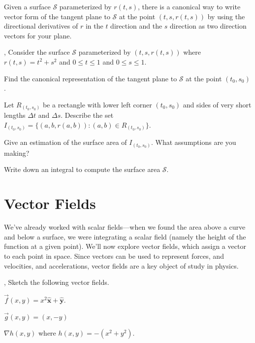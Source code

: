 \documentclass[letter]{article}
\newcommand{\xh}{{\hat {\mathbf x}}}
\newcommand{\yh}{{\hat {\mathbf y}}}
\newcommand{\R}{\mathbb{R}}
\renewcommand{\emph}[1]{{\color{defcolor} \textbf{\textit{##1}}}}
\begin{document}
	Given a surface $\mathcal S$ parameterized by $r(t,s)$, there is a canonical way to write vector form
	of the tangent plane to $\mathcal S$ at the point $(t,s,r(t,s))$ by using the directional derivatives
	of $r$ in the $t$ direction and the $s$ direction as two direction vectors for your plane.
	
	\sep
	Consider the surface $\mathcal S$ parameterized by $(t,s,r(t,s))$ where $r(t,s) = t^2+s^2$ and $0\leq t\leq 1$ and $0\leq s\leq 1$.
	\begin{Enum}
		\item Find the canonical representation of the tangent plane to $\mathcal S$ at the point
			$(t_0,s_0)$.
		\item Let $R_{(t_0,s_0)}$ be a rectangle with lower left corner $(t_0,s_0)$ and sides of 
			very short lengths $\Delta t$ and $\Delta s$.  Describe the set $I_{(t_0,s_0)}=\{(a,b,r(a,b)): (a,b)\in R_{(t_0,s_0)}\}$.
		\item Give an estimation of the surface area of $I_{(t_0,s_0)}$.  What assumptions are you making?
		\item Write down an integral to compute the surface area $\mathcal S$.
	\end{Enum}

\newpage
\section*{Vector Fields}

	\vspace{-1cm}

	We've already worked with scalar fields---when we found the area above a curve and below
	a surface, we were integrating a scalar field (namely the height of the function at a given point).
	We'll now explore vector fields, which assign a vector to each point in space.
	Since vectors can be used to represent forces, and velocities, and accelerations, vector fields are a key object of study in physics.

	\sep
	Sketch the following vector fields.
	\begin{Enum}
		\item $\vec f(x,y) = x^2\xh +\yh$.
		\item $\vec g(x,y) = (x,-y)$
		\item $\nabla h(x,y)$ where $h(x,y) = -(x^2+y^2)$.
	\end{Enum}
\end{document}
